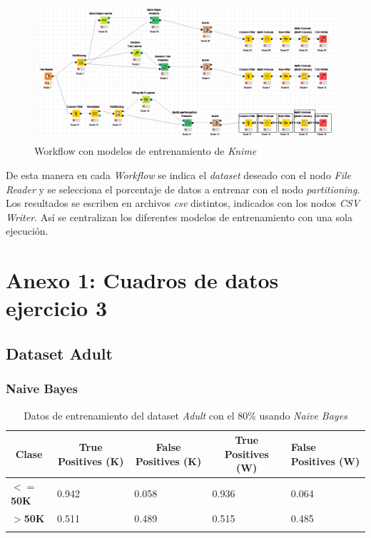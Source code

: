 \documentclass[10pt,a4paper]{article}
\begin{document}
\begin{figure}[h!]
	\centering
	\includegraphics[scale=0.5]{images/workflow_ej3_knime.png}
	\caption{Workflow con modelos de entrenamiento de \textit{Knime}}
	\label{fig:workflow_knime}
\end{figure}

De esta manera en cada \textit{Workflow} se indica el \textit{dataset} deseado con el nodo \textit{File Reader} y se selecciona el porcentaje de datos a entrenar con el nodo \textit{partitioning}. Los resultados se escriben en archivos \textit{csv} distintos, indicados con los nodos \textit{CSV Writer}. Así se centralizan los diferentes modelos de entrenamiento con una sola ejecución.\\


\newpage
\section{Anexo 1: Cuadros de datos ejercicio 3}

\subsection{Dataset Adult}

\subsubsection{Naive Bayes}
\begin{table}[h]
\begin{tabular}{lllll}
\hline
\multicolumn{1}{|c|}{\textbf{Clase}} & \multicolumn{1}{c|}{\textbf{True Positives (K)}} & \multicolumn{1}{c|}{\textbf{False Positives (K)}} & \multicolumn{1}{c|}{\textbf{True Positives (W)}} & \multicolumn{1}{l|}{\textbf{False Positives (W)}} \\ \hline
\multicolumn{1}{|l|}{\textbf{$<=$50K}} & \multicolumn{1}{l|}{0.942}          & \multicolumn{1}{l|}{0.058}          & \multicolumn{1}{l|}{0.936}          & \multicolumn{1}{l|}{0.064} \\ \hline
\multicolumn{1}{|l|}{\textbf{$>$50K}} & \multicolumn{1}{l|}{0.511}          & \multicolumn{1}{l|}{0.489}          & \multicolumn{1}{l|}{0.515}          & \multicolumn{1}{l|}{0.485} \\ \hline
\textbf{}                       &                                &                                &                                &                      
\end{tabular}
\caption{Datos de entrenamiento del dataset \emph{Adult} con el 80\% usando \emph{Naive Bayes}}
\label{tab:adult_bayes_80}
\end{table}
\end{document}
